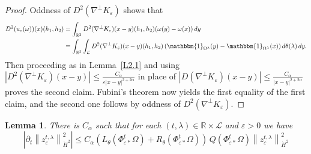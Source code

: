 \documentclass[reqno,centertags,12pt]{amsart}
\newtheorem{lemma}[theorem]{Lemma}
\theoremstyle{definition}
\numberwithin{equation}{section}
\newcommand{\abs}[1]{\left\lvert#1\right\rvert}
\newcommand{\norm}[1]{\left\|#1\right\|}
\newcommand{\bbR}{{\mathbb{R}}}
\newcommand{\eps}{\varepsilon}
\newcommand{\tht}{\theta}
\begin{document}
\begin{proof}
    Oddness of $D^{2}(\nabla^{\perp}K_{\eps})$ shows that
    \begin{align*}
        D^{2}(u_{\eps}(\omega))(x)(h_{1},h_{2})
        &= \int_{\bbR^{2}}D^{2}(\nabla^{\perp}K_{\eps})(x - y)(h_{1},h_{2})
        (\omega(y) - \omega(x))\,dy \\
        &= \int_{\bbR^{2}}\int_{\mathcal{L}}
        D^{2}(\nabla^{\perp}K_{\eps})(x - y)(h_{1},h_{2})
        \left(\mathbbm{1}_{\Omega^{\lambda}}(y) - \mathbbm{1}_{\Omega^{\lambda}}(x)\right)
        d\theta(\lambda)\,dy.
    \end{align*}
    Then proceeding as in Lemma~\ref{L2.1} and using 
    $\abs{D^{2}(\nabla^{\perp}K_{\eps})(x - y)}
    \leq \frac{C_{\alpha}}{\eps\abs{x - y}^{2+2\alpha}}$
    in place of $\abs{D(\nabla^{\perp}K_{\eps})(x - y)}
    \leq \frac{C_{\alpha}}{\abs{x - y}^{2+2\alpha}}$ proves the second claim.
    Fubini's theorem now yields the first equality of the first claim,
    and the second one follows by oddness of $D^{2}(\nabla^{\perp}K_{\eps})$.
\end{proof}

\begin{lemma}\label{L3.7}
    There is $C_{\alpha}$ such that for each $(t,\lambda)\in\bbR\times\mathcal{L}$ and $\eps>0$ we have
    \begin{equation}\label{3.11}
        \abs{\partial_{t}\norm{z_{\eps}^{t,\lambda}}_{\dot{H}^{2}}^{2}}
        \leq C_{\alpha}(L_{\tht}(\Phi_{\eps*}^{t}\Omega) + R_{\tht}(\Phi_{\eps*}^{t}\Omega)) \,
        Q(\Phi_{\eps*}^{t}\Omega)\norm{z_{\eps}^{t,\lambda}}_{\dot{H}^{2}}^{2}
    \end{equation}
\end{lemma}
\end{document}

